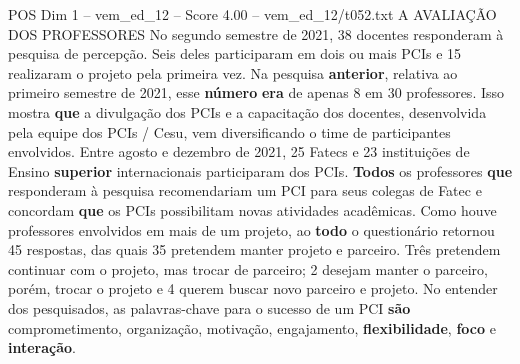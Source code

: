 \begin{textsample}{POS Dim 1 – vem\_ed\_12 – Score 4.00 – vem\_ed\_12/t052.txt}  \label{ex:f1_pos_187}
A AVALIAÇÃO DOS PROFESSORES No segundo semestre de 2021, 38 docentes responderam à pesquisa de percepção.
Seis deles participaram em dois ou mais PCIs e 15 realizaram o projeto pela primeira vez.
Na pesquisa \textbf{anterior}, relativa ao primeiro semestre de 2021, esse \textbf{número} \textbf{era} de apenas 8 em 30 professores.
Isso mostra \textbf{que} a divulgação dos PCIs e a capacitação dos docentes, desenvolvida pela equipe dos PCIs / Cesu, vem diversificando o time de participantes envolvidos.
Entre agosto e dezembro de 2021, 25 Fatecs e 23 instituições de Ensino \textbf{superior} internacionais participaram dos PCIs. \textbf{Todos} os professores \textbf{que} responderam à pesquisa recomendariam um PCI para seus colegas de Fatec e concordam \textbf{que} os PCIs possibilitam novas atividades acadêmicas.
Como houve professores envolvidos em mais de um projeto, ao \textbf{todo} o questionário retornou 45 respostas, das quais 35 pretendem manter projeto e parceiro.
Três pretendem continuar com o projeto, mas trocar de parceiro; 2 desejam manter o parceiro, porém, trocar o projeto e 4 querem buscar novo parceiro e projeto.
No entender dos pesquisados, as palavras-chave para o sucesso de um PCI \textbf{são} comprometimento, organização, motivação, engajamento, \textbf{flexibilidade}, \textbf{foco} e \textbf{interação}.

\end{textsample}
